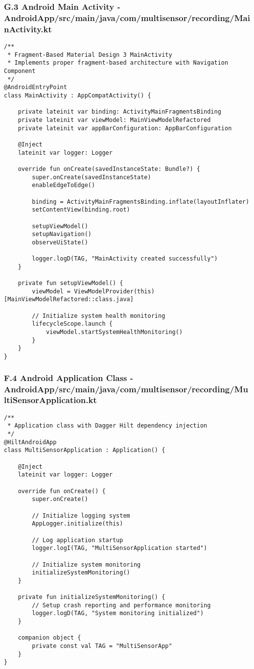 \documentclass[11pt,a4paper]{article}
\begin{document}
\subsubsection{G.3 Android Main Activity - AndroidApp/src/main/java/com/multisensor/recording/MainActivity.kt}

\begin{verbatim}
/**
 * Fragment-Based Material Design 3 MainActivity
 * Implements proper fragment-based architecture with Navigation Component
 */
@AndroidEntryPoint
class MainActivity : AppCompatActivity() {

    private lateinit var binding: ActivityMainFragmentsBinding
    private lateinit var viewModel: MainViewModelRefactored
    private lateinit var appBarConfiguration: AppBarConfiguration

    @Inject
    lateinit var logger: Logger

    override fun onCreate(savedInstanceState: Bundle?) {
        super.onCreate(savedInstanceState)
        enableEdgeToEdge()

        binding = ActivityMainFragmentsBinding.inflate(layoutInflater)
        setContentView(binding.root)

        setupViewModel()
        setupNavigation()
        observeUiState()

        logger.logD(TAG, "MainActivity created successfully")
    }

    private fun setupViewModel() {
        viewModel = ViewModelProvider(this)[MainViewModelRefactored::class.java]

        // Initialize system health monitoring
        lifecycleScope.launch {
            viewModel.startSystemHealthMonitoring()
        }
    }
}
\end{verbatim}

\subsubsection{F.4 Android Application Class - AndroidApp/src/main/java/com/multisensor/recording/MultiSensorApplication.kt}

\begin{verbatim}
/**
 * Application class with Dagger Hilt dependency injection
 */
@HiltAndroidApp
class MultiSensorApplication : Application() {

    @Inject
    lateinit var logger: Logger

    override fun onCreate() {
        super.onCreate()

        // Initialize logging system
        AppLogger.initialize(this)

        // Log application startup
        logger.logI(TAG, "MultiSensorApplication started")

        // Initialize system monitoring
        initializeSystemMonitoring()
    }

    private fun initializeSystemMonitoring() {
        // Setup crash reporting and performance monitoring
        logger.logD(TAG, "System monitoring initialized")
    }

    companion object {
        private const val TAG = "MultiSensorApp"
    }
}
\end{verbatim}
\end{document}
